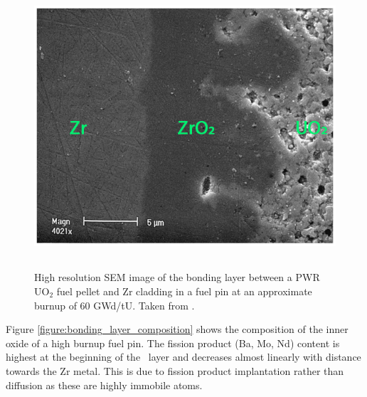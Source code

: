 \begin{figure}[htp]
\centering
\includegraphics[height=10.5cm]{images/pci_bondinglayer.png}
\caption[High resolution SEM image of the bonding layer between a PWR UO$_{2}$ fuel pellet and Zr cladding in a fuel pin at an approximate burnup of 60 GWd/tU.]{High resolution SEM image of the bonding layer between a PWR UO$_{2}$ fuel pellet and Zr cladding in a fuel pin at an approximate burnup of 60 GWd/tU. Taken from \cite{Lozano1998}.}
\label{figure:inner_oxide}
\end{figure}

Figure \ref{figure:bonding_layer_composition} shows the composition of the inner oxide of a high burnup fuel pin. The fission product (Ba, Mo, Nd) content is highest at the beginning of the \zirconia\ layer and decreases almost linearly with distance towards the Zr metal. This is due to fission product implantation rather than diffusion as these are highly immobile atoms. %


